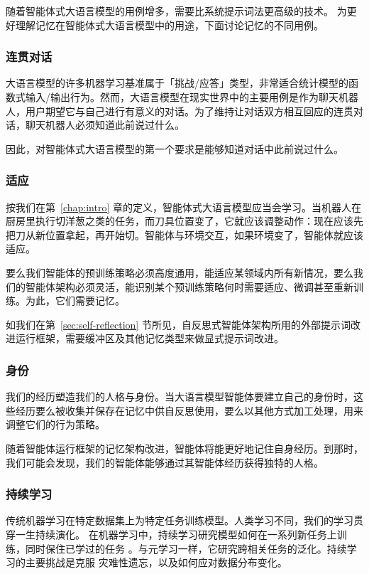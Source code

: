 随着智能体式大语言模型的用例增多，需要比系统提示词法更高级的技术。
为更好理解记忆在智能体式大语言模型中的用途，下面讨论记忆的不同用例。

\subsubsection{连贯对话}
大语言模型的许多机器学习基准属于「挑战/应答」类型，非常适合统计模型的函数式输入/输出行为。然而，大语言模型在现实世界中的主要用例是作为聊天机器人，用户期望它与自己进行有意义的对话。为了维持让对话双方相互回应的连贯对话，聊天机器人必须知道此前说过什么。

因此，对智能体式大语言模型的第一个要求是能够知道对话中此前说过什么。


\subsubsection{适应}
按我们在第~\ref{chap:intro} 章的定义，智能体式大语言模型应当会学习。当机器人在厨房里执行切洋葱之类的任务，而刀具位置变了，它就应该调整动作：现在应该先把刀从新位置拿起，再开始切。智能体与环境交互，如果环境变了，智能体就应该适应。

要么我们智能体的预训练策略必须高度通用，能适应某领域内所有新情况，要么我们的智能体架构必须灵活，能识别某个预训练策略何时需要适应、微调甚至重新训练。为此，它们需要记忆。

如我们在第~\ref{sec:self-reflection} 节所见，自反思式智能体架构所用的外部提示词改进运行框架，需要缓冲区及其他记忆类型来做显式提示词改进。

\subsubsection{身份}
我们的经历塑造我们的人格与身份。当大语言模型智能体要建立自己的身份时，这些经历要么被收集并保存在记忆中供自反思使用，要么以其他方式加工处理，用来调整它们的行为策略。

随着智能体运行框架的记忆架构改进，智能体将能更好地记住自身经历。到那时，我们可能会发现，我们的智能体能够通过其智能体经历获得独特的人格。

\subsubsection{持续学习}
传统机器学习在特定数据集上为特定任务训练模型。人类学习不同，我们的学习贯穿一生持续演化。
在机器学习中，持续学习研究模型如何在一系列新任务上训练，同时保住已学过的任务 \citep{wang2024comprehensive,li2025improving}。与元学习一样，它研究跨相关任务的泛化。持续学习的主要挑战是克服
灾难性遗忘，以及如何应对数据分布变化。

